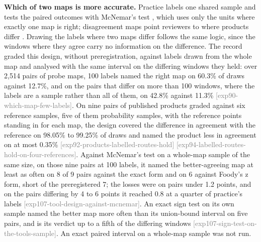\documentclass[11pt,a4paper]{article}
\newcommand{\claim}[1]{{\scriptsize\textsf{\textcolor{gray}{[#1]}}}}
\begin{document}
\textbf{Which of two maps is more accurate.} Practice labels one shared sample and tests the paired outcomes with
McNemar's test \citep{foody2004}, which uses only the units where exactly one map is right; disagreement maps point
reviewers to where products differ \citep{fritz2008}. Drawing the labels where two maps differ follows the same logic,
since the windows where they agree carry no information on the difference. The record graded this design, without
preregistration, against labels drawn from the whole map and analysed with the same interval on the differing windows
they held: over 2,514 pairs of probe maps, 100 labels named the right map on 60.3\% of draws against 12.7\%, and on the
pairs that differ on more than 100 windows, where the labels are a sample rather than all of them, on 42.8\% against
11.3\% \claim{exp90-which-map-few-labels}. On nine pairs of published products graded against six reference samples,
five of them probability samples, with the reference points standing in for each map, the design covered the difference
in agreement with the reference on 98.05\% to 99.25\% of draws and named the product less in agreement on at most 0.35\%
\claim{exp92-products-labelled-routes-hold} \claim{exp94-labelled-routes-hold-on-four-references}. Against McNemar's
test on a whole-map sample of the same size, on those nine pairs at 100 labels, it named the better-agreeing map at least
as often on 8 of 9 pairs against the exact form and on 6 against Foody's z form, short of the preregistered 7; the losses
were on pairs under 1.2 points, and on the pairs differing by 4 to 6 points it reached 0.8 at a quarter of practice's
labels \claim{exp107-tool-design-against-mcnemar}. An exact sign test on its own sample named the better map more often
than its union-bound interval on five pairs, and is its verdict up to a fifth of the differing windows
\claim{exp107-sign-test-on-the-tools-sample}. An exact paired interval on a whole-map sample was not run.
\end{document}
